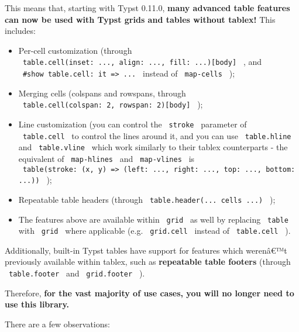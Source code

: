 This means that, starting with Typst 0.11.0, \textbf{many advanced table
features can now be used with Typst grids and tables without tablex!}
This includes:

\begin{itemize}
\tightlist
\item
  Per-cell customization (through
  \texttt{\ table.cell(inset:\ ...,\ align:\ ...,\ fill:\ ...){[}body{]}\ }
  , and \texttt{\ \#show\ table.cell:\ it\ =\textgreater{}\ ...\ }
  instead of \texttt{\ map-cells\ } );
\item
  Merging cells (colspans and rowspans, through
  \texttt{\ table.cell(colspan:\ 2,\ rowspan:\ 2){[}body{]}\ } );
\item
  Line customization (you can control the \texttt{\ stroke\ } parameter
  of \texttt{\ table.cell\ } to control the lines around it, and you can
  use \texttt{\ table.hline\ } and \texttt{\ table.vline\ } which work
  similarly to their tablex counterparts - the equivalent of
  \texttt{\ map-hlines\ } and \texttt{\ map-vlines\ } is
  \texttt{\ table(stroke:\ (x,\ y)\ =\textgreater{}\ (left:\ ...,\ right:\ ...,\ top:\ ...,\ bottom:\ ...))\ }
  );
\item
  Repeatable table headers (through
  \texttt{\ table.header(...\ cells\ ...)\ } );
\item
  The features above are available within \texttt{\ grid\ } as well by
  replacing \texttt{\ table\ } with \texttt{\ grid\ } where applicable
  (e.g. \texttt{\ grid.cell\ } instead of \texttt{\ table.cell\ } ).
\end{itemize}

Additionally, built-in Typst tables have support for features which
werenâ€™t previously available within tablex, such as \textbf{repeatable
table footers} (through \texttt{\ table.footer\ } and
\texttt{\ grid.footer\ } ).

Therefore, \textbf{for the vast majority of use cases, you will no
longer need to use this library.}

There are a few observations:

